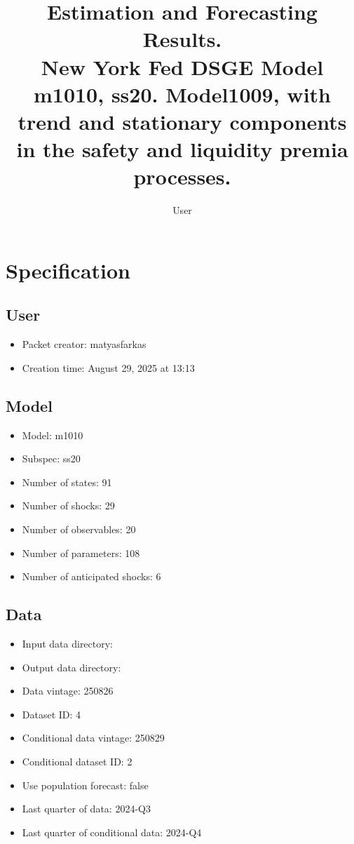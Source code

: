 \documentclass{article}
\title{Estimation and Forecasting Results. \\ New York Fed DSGE Model m1010, ss20. Model1009, with trend and stationary components in the safety and liquidity premia processes.}
\author{User}
\begin{document}
\maketitle


\section{Specification}

\subsection{User}

\begin{itemize}
  \item Packet creator: matyasfarkas
  \item Creation time: August 29, 2025 at 13:13
\end{itemize}

\subsection{Model}

\begin{itemize}
  \item Model: m1010
  \item Subspec: ss20
  \item Number of states: 91
  \item Number of shocks: 29
  \item Number of observables: 20
  \item Number of parameters: 108
  \item Number of anticipated shocks: 6
\end{itemize}

\subsection{Data}

\begin{itemize}
  \item Input data directory: 
  \item Output data directory: 
  \item Data vintage: 250826
  \item Dataset ID: 4
  \item Conditional data vintage: 250829
  \item Conditional dataset ID: 2
  \item Use population forecast: false
  \item Last quarter of data: 2024-Q3
  \item Last quarter of conditional data: 2024-Q4
\end{itemize}
\end{document}
